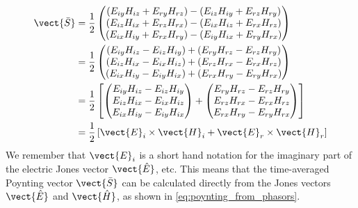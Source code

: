 \begin{subequations}
\begin{align}
    \vect{\bar{S}}
    &= \frac{1}{2}
    \begin{pmatrix}
        (E_{iy}H_{iz} + E_{ry}H_{rz}) -
        (E_{iz}H_{iy} + E_{rz}H_{ry})
        \\
        (E_{iz}H_{ix} + E_{rz}H_{rx}) -
        (E_{ix}H_{iz} + E_{rx}H_{rz})
        \\
        (E_{ix}H_{iy} + E_{rx}H_{ry}) -
        (E_{iy}H_{ix} + E_{ry}H_{rx})
    \end{pmatrix}
    \label{eq:poynting_average_detail_0}
    \\
    &= \frac{1}{2}
    \begin{pmatrix}
        (E_{iy}H_{iz} - E_{iz}H_{iy}) + 
        (E_{ry}H_{rz} - E_{rz}H_{ry})
        \\
        (E_{iz}H_{ix} - E_{ix}H_{iz}) + 
        (E_{rz}H_{rx} - E_{rx}H_{rz})
        \\
        (E_{ix}H_{iy} - E_{iy}H_{ix}) +
        (E_{rx}H_{ry} - E_{ry}H_{rx})
    \end{pmatrix}
    \label{eq:poynting_average_detail_1}
    \\
    &= \frac{1}{2}
    \left[
    \begin{pmatrix}
        E_{iy}H_{iz} - E_{iz}H_{iy} \\
        E_{iz}H_{ix} - E_{ix}H_{iz} \\
        E_{ix}H_{iy} - E_{iy}H_{ix} 
    \end{pmatrix}
    +
    \begin{pmatrix}
        E_{ry}H_{rz} - E_{rz}H_{ry} \\
        E_{rz}H_{rx} - E_{rx}H_{rz} \\
        E_{rx}H_{ry} - E_{ry}H_{rx}        
    \end{pmatrix}
    \right]
    \label{eq:poynting_average_detail_2}
    \\
    &= \frac{1}{2}
    \left[
        \vect{E}_i \times \vect{H}_i
    +
        \vect{E}_r \times \vect{H}_r
    \right]
    \label{eq:poynting_average_detail_3}
\end{align}
\end{subequations}
We remember that $\vect{E}_i$ is a short hand notation for the imaginary part of the electric Jones vector $\vect{\hat{E}}$, etc.
This means that the time-averaged Poynting vector $\vect{\bar{S}}$ can be calculated directly from the Jones vectors $\vect{\hat{E}}$ and $\vect{\hat{H}}$, as shown in \cref{eq:poynting_from_phasors}.
